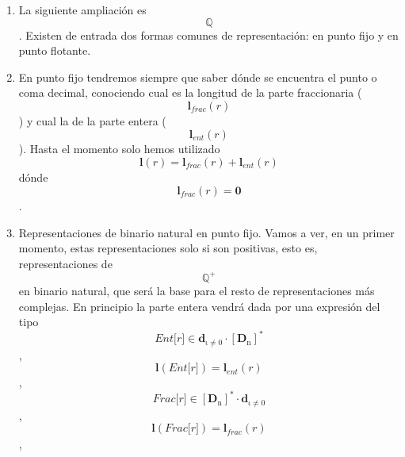 \begin{enumerate}
\begin{enumerate}
\begin{enumerate}
      Y así queda definido el lenguaje de las representaciones en
      complemento a una base y su semántica de valores en
      \[\mathbb{Z}\].
    \item
      Exceso a \[\mathit{n}\]. Este tipo de representación no necesita
      signo siendo, el valor de la representación su valor en binario
      natural menos \[\mathit{n}\]. La representación
      \[\mathbf{0}\]tiene como valor \[- \mathit{n}\]. En general el
      valor de la representación \[\mathit{r}\] en Exceso a
      \[\mathit{n}\]será \[{\mathbf{\nu}{(\mathit{r})}} - \mathit{n}\],
      siendo la función \[{valor} - \nu\] la correspondiente al
      bina\-rio natural.
    \end{enumerate}
  \item
    La siguiente ampliación es \[\mathbb{Q}\]. Existen de entrada dos
    formas comunes de repre\-sentación: en punto fijo y en punto
    flotante.
  \item
    En punto fijo tendremos siempre que saber dónde se encuentra el
    punto o coma deci\-mal, conociendo cual es la longitud de la parte
    fraccionaria
    (\[\mathbf{l}_{\mathbf{\mathrm{\mathit{frac}}}}{(\mathit{r})}\]) y
    cual la de la parte entera
    (\[\mathbf{l}_{\mathbf{\mathrm{\mathit{ent}}}}{(\mathit{r})}\]).
    Hasta el momento solo hemos utilizado
    \[\mathbf{l}{{(\mathit{r})} = \mathbf{l}_{\mathbf{\mathrm{\mathit{frac}}}}}{{(\mathit{r})} + \mathbf{l}_{\mathbf{\mathrm{\mathit{ent}}}}}{(\mathit{r})}\]dónde
    \[\mathbf{l}_{\mathbf{\mathrm{\mathit{frac}}}}{{(\mathit{r})} = \mathbf{0}}\].
  \item
    Representaciones de binario natural en punto fijo. Vamos a ver, en
    un primer mo\-mento, estas representaciones solo si son positivas,
    esto es, representaciones de \[\mathbb{Q}^{\mathbf{\mathrm{+}}}\]en
    binario natural, que será la base para el resto de representaciones
    más com\-plejas. En principio la parte entera vendrá dada por una
    expresión del tipo
    \[\mathit{{Ent}{\lbrack r\rbrack}} \in {\mathbf{d}_{\mathbf{\mathrm{\iota \neq 0}}} \cdot \left\lbrack \mathbf{D}_{\mathbf{\mathrm{n}}} \right\rbrack^{\mathbf{\mathrm{\ast}}}}\],
    \[{\mathbf{l}{(\mathit{{Ent}{\lbrack r\rbrack}})}} = {\mathbf{l}_{\mathbf{\mathrm{\mathit{ent}}}}{(\mathit{r})}}\],
    \[\mathit{{Frac}{\lbrack r\rbrack}} \in {\left\lbrack \mathbf{D}_{\mathbf{\mathrm{n}}} \right\rbrack^{\mathbf{\mathrm{\ast}}} \cdot \mathbf{d}_{\mathbf{\mathrm{\iota \neq 0}}}}\],
    \[{\mathbf{l}{(\mathit{{Frac}{\lbrack r\rbrack}})}} = {\mathbf{l}_{\mathbf{\mathrm{\mathit{frac}}}}{(\mathit{r})}}\],

\end{enumerate}
\end{enumerate}
